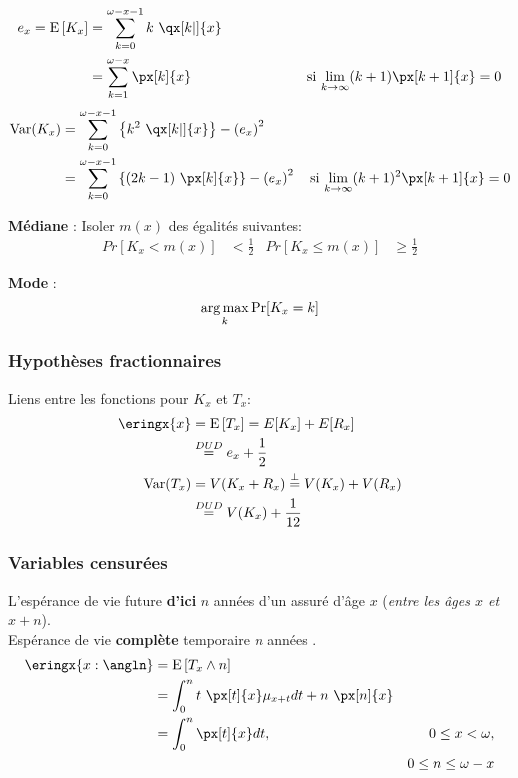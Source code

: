 \documentclass[10pt, french]{article}
\begin{document}
\begin{multicols*}{3}
\begin{align*}
	e_{x}
	=	\esp{K_{x}}
	&=	\sum_{k = 0}^{\omega - x - 1} k \ \qx[k | ]{x}	\\
	&=	\sum_{k = 1}^{\omega - x} \px[k]{x} 	\qquad\qquad\qquad\qquad\;	\text{si } \limz{k}{\infty} (k + 1) \px[k + 1]{x} = 0
\end{align*}
\begin{align*}
	\text{Var}(K_{x}) 
	&=	\sum_{k = 0}^{\omega - x - 1}\left\{ k^{2} \ \qx[k | ]{x} \right\} - \left(e_{x}\right)^2	\\
	&=	\sum_{k = 0}^{\omega - x - 1}\left\{ (2k - 1) \ \px[k]{x} \right\} - \left(e_{x}\right)^2 \quad \text{si } \limz{k}{\infty} (k + 1)^{2} \px[k + 1]{x} = 0	\\
\end{align*}

\textbf{Médiane} : Isoler $m(x)$ des égalités suivantes:
\begin{align*}
	Pr[K_{x} 	<	 m(x)] 
	&<		\frac{1}{2}	&
	Pr[K_{x} 	\leq	 m(x)] 
	&\geq	\frac{1}{2} 
\end{align*}

\textbf{Mode} : 
\begin{align*}
	\operatorname*{arg\,max}_k \text{Pr}[K_x = k]
\end{align*}

\subsubsection*{Hypothèses fractionnaires}

Liens entre les fonctions pour $K_x$ et $T_x$:\\
\begin{align*}
	\eringx{x} 
	&=	\esp{T_{x}} 
	=	E[K_x] + E[R_x]	\\
	&\overset{DUD}{=}	e_x + \frac{1}{2}	\\
	\text{Var}(T_{x})
	&=	V(K_x + R_x) 
	\overset{\bot}{=}	V(K_x) + V(R_x) \\
	&\overset{DUD}{=}	V(K_x) + \frac{1}{12} 
\end{align*}

\subsubsection{Variables censurées}
L'espérance de vie future \textbf{d'ici} $n$ années d'un assuré d'âge $x$ (\textit{entre les âges $x$ et $x+n$}).\\

Espérance de vie \textbf{complète} temporaire \textit{n} années .
\begin{align*}
\eringx{x:\angln} &= \esp{T_x \wedge n} \\
&= \int_0^{n}t \ \px[t]{x} \mu_{x + t} dt + n \ \px[n]{x} \\
&= \int_0^{n} \px[t]{x} dt, & 0 \leq x < \omega, \\
&& 0 \leq n \leq \omega - x 
\end{align*}


\end{multicols*}
\end{document}
